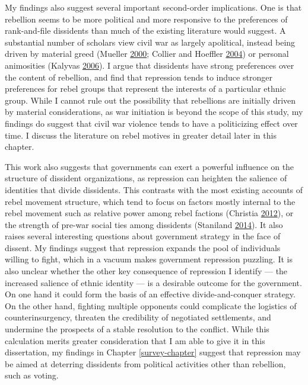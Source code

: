 \documentclass[12pt,]{book}
\theoremstyle{definition}
\theoremstyle{definition}
\theoremstyle{remark}
\begin{document}
My findings also suggest several important second-order implications.
One is that rebellion seems to be more political and more responsive to
the preferences of rank-and-file dissidents than much of the existing
literature would suggest. A substantial number of scholars view civil
war as largely apolitical, instead being driven by material greed
(Mueller \protect\hyperlink{ref-mueller00}{2000}; Collier and Hoeffler
\protect\hyperlink{ref-Collier2004}{2004}) or personal animosities
(Kalyvas \protect\hyperlink{ref-Kalyvas2006}{2006}). I argue that
dissidents have strong preferences over the content of rebellion, and
find that repression tends to induce stronger preferences for rebel
groups that represent the interests of a particular ethnic group. While
I cannot rule out the possibility that rebellions are initially driven
by material considerations, as war initiation is beyond the scope of
this study, my findings do suggest that civil war violence tends to have
a politicizing effect over time. I discuss the literature on rebel
motives in greater detail later in this chapter.

This work also suggests that governments can exert a powerful influence
on the structure of dissident organizations, as repression can heighten
the salience of identities that divide dissidents. This contrasts with
the most existing accounts of rebel movement structure, which tend to
focus on factors mostly internal to the rebel movement such as relative
power among rebel factions (Christia
\protect\hyperlink{ref-Christia2012}{2012}), or the strength of pre-war
social ties among dissidents (Staniland
\protect\hyperlink{ref-Staniland2014}{2014}). It also raises several
interesting questions about government strategy in the face of dissent.
My findings suggest that repression expands the pool of individuals
willing to fight, which in a vacuum makes government repression
puzzling. It is also unclear whether the other key consequence of
repression I identify --- the increased salience of ethnic identity ---
is a desirable outcome for the government. On one hand it could form the
basis of an effective divide-and-conquer strategy. On the other hand,
fighting multiple opponents could complicate the logistics of
counterinsurgency, threaten the credibility of negotiated settlements,
and undermine the prospects of a stable resolution to the conflict.
While this calculation merits greater consideration that I am able to
give it in this dissertation, my findings in Chapter
\ref{survey-chapter} suggest that repression may be aimed at deterring
dissidents from political activities other than rebellion, such as
voting.
\end{document}
